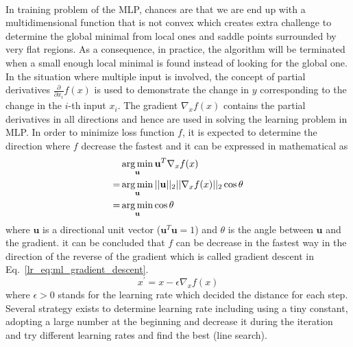 \paragraph{}
In training problem of the MLP, chances are that we are end up with a multidimensional function that is not convex which creates extra challenge to determine the global minimal from local ones and saddle points surrounded by very flat regions.
As a consequence, in practice, the algorithm will be terminated when a small enough local minimal is found instead of looking for the global one.
In the situation where multiple input is involved, the concept of partial derivatives $\frac{\partial}{\partial x_i}f(x)$ is used to demonstrate the change in $y$ corresponding to the change in the $i$-th input $x_i$.
The gradient $\nabla_x f(x)$ contains the partial derivatives in all directions and hence are used in solving the learning problem in MLP.
In order to minimize loss function $f$, it is expected to determine the direction where $f$ decrease the fastest and it can be expressed in mathematical as
\begin{equation}
    \begin{aligned}
    & \operatorname*{arg\,min}_{\mathbf{u}} \mathbf{u}^T \nabla_x f(x)\\
    = & \operatorname*{arg\,min}_{\mathbf{u}} || \mathbf{u} ||_2 ||\nabla_xf(x)||_2 \cos\theta \\
    = & \operatorname*{arg\,min}_{\mathbf{u}} \cos\theta
    \end{aligned}
\end{equation}
where $\mathbf{u}$ is a directional unit vector ($\mathbf{u}^T\mathbf{u}=1$) and $\theta$ is the angle between $\mathbf{u}$ and the gradient.
it can be concluded that $f$ can be decrease in the fastest way in the direction of the reverse of the gradient which is called gradient descent in Eq.~\ref{lr_eq:ml_gradient_descent}.
\begin{equation}
    x^\prime = x - \epsilon \nabla_x f(x)
    \label{lr_eq:ml_gradient_descent}
\end{equation}
where $\epsilon > 0$ stands for the learning rate which decided the distance for each step.
Several strategy exists to determine learning rate including using a tiny constant, adopting a large number at the beginning and decrease it during the iteration and try different learning rates and find the best (line search).

